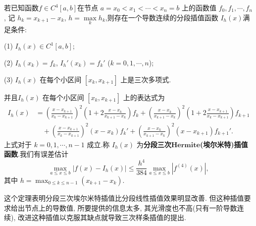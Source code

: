 \documentclass[../../main.tex]{subfiles}%
\begin{document}
\begin{theorem}
若已知函数$f\in C^4[a,b]$在节点 $a = x_0 < x_1 < \cdots < x_n = b$ 上的函数值 $f_0, f_1, \cdots, f_n$, 记 $h_k = x_{k + 1} - x_k$, $h = \max\limits_k h_k$,则存在一个导数连续的分段插值函数 $I_h(x)$满足条件:

(1) $I_h(x) \in C^1[a, b]$;

(2) $I_h(x_k) = f_k$, $I_h'(x_k) = f_k'$ ($k = 0, 1, \cdots, n$);

(3) $I_h(x)$ 在每个小区间 $[x_k, x_{k + 1}]$ 上是三次多项式.

并且$I_h(x)$ 在每个小区间 $[x_k, x_{k + 1}]$ 上的表达式为
\begin{align}
I_h(x) &= \left( \frac{x - x_{k + 1}}{x_k - x_{k + 1}} \right)^2 \left( 1 + 2 \frac{x - x_k}{x_{k + 1} - x_k} \right) f_k + \left( \frac{x - x_k}{x_{k + 1} - x_k} \right)^2 \left( 1 + 2 \frac{x - x_{k + 1}}{x_k - x_{k + 1}} \right) f_{k + 1} \nonumber \\
&\quad + \left( \frac{x - x_{k + 1}}{x_k - x_{k + 1}} \right)^2 (x - x_k) f_k' + \left( \frac{x - x_k}{x_{k + 1} - x_k} \right)^2 (x - x_{k + 1}) f_{k + 1}'. \label{5.3}
\end{align}
上式对于 $k = 0, 1, \cdots, n - 1$ 成立.称 $I_h(x)$ 为\textbf{分段三次}$\mathbf{Hermite}$\textbf{(埃尔米特)插值函数}.我们有误差估计
\[
\max_{a \leqslant x \leqslant b} | f(x) - I_h(x) | \leqslant \frac{h^4}{384} \max_{a \leqslant x \leqslant b} | f^{(4)}(x) |,
\]
其中 $h = \max_{0 \leqslant k \leqslant n - 1} (x_{k + 1} - x_k)$.
\end{theorem}
\begin{note}
这个定理表明分段三次埃尔米特插值比分段线性插值效果明显改善. 但这种插值要求给出节点上的导数值, 所要提供的信息太多, 其光滑度也不高(只有一阶导数连续), 改进这种插值以克服其缺点就导致三次样条插值的提出.
\end{note}
\end{document}
